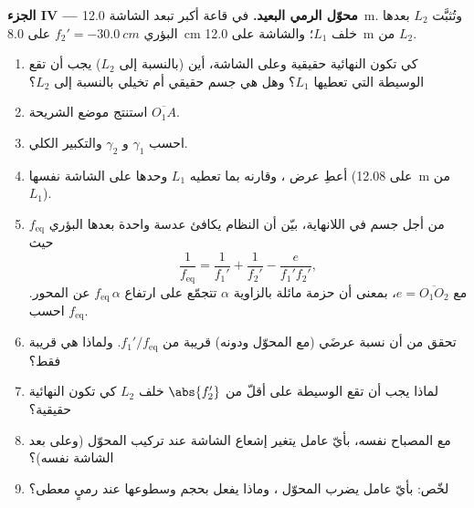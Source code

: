\begin{problem}
\medskip
\noindent\textbf{الجزء IV --- محوّل الرمي البعيد.}
في قاعة أكبر تبعد الشاشة \qty{12.0}{m}. وتُثبَّت 
$L_2$ بعدها البؤري $f_2' = \qty{-30.0}{cm}$ على \qty{8.0}{cm} خلف
$L_1$؛ والشاشة على \qty{12.0}{m} من $L_2$.
\begin{enumerate}[resume]
  \item كي تكون  النهائية حقيقية وعلى الشاشة، أين (بالنسبة إلى
        $L_2$) يجب أن تقع  الوسيطة التي تعطيها $L_1$؟ وهل هي
        جسم حقيقي أم تخيلي بالنسبة إلى $L_2$؟
  \item استنتج موضع الشريحة $\overline{O_1A}$.
  \item احسب $\gamma_1$ و $\gamma_2$ والتكبير الكلي.
  \item أعطِ عرض ، وقارنه بما تعطيه $L_1$ وحدها
        على الشاشة نفسها (على \qty{12.08}{m} من $L_1$).
  \item من أجل جسم في اللانهاية، بيّن أن النظام يكافئ
        عدسة واحدة بعدها البؤري $f_{\mathrm{eq}}$ حيث
        \[
        \frac{1}{f_{\mathrm{eq}}} = \frac{1}{f_1'} + \frac{1}{f_2'} - \frac{e}{f_1' f_2'},
        \]
        مع $e = \overline{O_1O_2}$، بمعنى أن حزمة مائلة بالزاوية
        $\alpha$ تتجمّع على ارتفاع $f_{\mathrm{eq}}\,\alpha$ عن
        المحور. احسب $f_{\mathrm{eq}}$.
  \item تحقق من أن نسبة عرضَي  (مع المحوّل ودونه)
        قريبة من $f_1'/f_{\mathrm{eq}}$. ولماذا هي قريبة فقط؟
  \item لماذا يجب أن تقع  الوسيطة على أقلّ من $\abs{f_2'}$
        خلف $L_2$ كي تكون  النهائية حقيقية؟
  \item مع المصباح نفسه، بأيّ عامل يتغير إشعاع الشاشة
        عند تركيب المحوّل (وعلى بعد الشاشة نفسه)؟
  \item لخّص: بأيّ عامل يضرب المحوّل ، وماذا
        يفعل بحجم  وسطوعها عند رميٍ معطى؟
\end{enumerate}
\end{problem}
